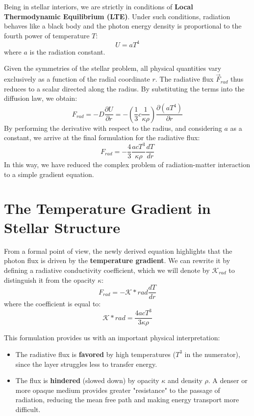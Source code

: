 Being in stellar interiors, we are strictly in conditions of \textbf{Local Thermodynamic Equilibrium (LTE)}. Under such conditions, radiation behaves like a black body and the photon energy density is proportional to the fourth power of temperature $T$:
\begin{equation}
U = a T^4
\end{equation}
where $a$ is the radiation constant.

Given the symmetries of the stellar problem, all physical quantities vary exclusively as a function of the radial coordinate $r$. The radiative flux $\vec{F}_{rad}$ thus reduces to a scalar directed along the radius.
By substituting the terms into the diffusion law, we obtain:
\begin{equation}
F_{rad} = - D \frac{\partial U}{\partial r} = - \left( \frac{1}{3} c \frac{1}{\kappa \rho} \right) \frac{\partial (a T^4)}{\partial r}
\end{equation}
By performing the derivative with respect to the radius, and considering $a$ as a constant, we arrive at the final formulation for the radiative flux:
\begin{equation}
F_{rad} = - \frac{4}{3} \frac{a c T^3}{\kappa \rho} \frac{dT}{dr}
\end{equation}
In this way, we have reduced the complex problem of radiation-matter interaction to a simple gradient equation.

\section{The Temperature Gradient in Stellar Structure}

From a formal point of view, the newly derived equation highlights that the photon flux is driven by the \textbf{temperature gradient}. We can rewrite it by defining a radiative conductivity coefficient, which we will denote by $\mathcal{K}_{rad}$ to distinguish it from the opacity $\kappa$:
\begin{equation}
F_{rad} = - \mathcal{K}*{rad} \frac{dT}{dr}
\end{equation}
where the coefficient is equal to:
\begin{equation}
\mathcal{K}*{rad} = \frac{4 a c T^3}{3 \kappa \rho}
\end{equation}

This formulation provides us with an important physical interpretation:
\begin{itemize}
\item The radiative flux is \textbf{favored} by high temperatures ($T^3$ in the numerator), since the layer struggles less to transfer energy.
\item The flux is \textbf{hindered} (slowed down) by opacity $\kappa$ and density $\rho$. A denser or more opaque medium provides greater "resistance" to the passage of radiation, reducing the mean free path and making energy transport more difficult.
\end{itemize}

